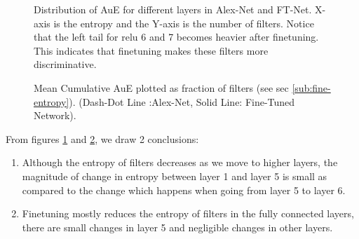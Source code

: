 \documentclass[runningheads]{llncs}
\begin{document}
\begin{figure}[t!]
\centering
{}
\caption{Distribution of AuE for different layers in Alex-Net and FT-Net. X-axis is the entropy and the Y-axis is the number of filters. Notice that the left tail for relu 6 and 7 becomes heavier after finetuning. This indicates that finetuning makes these filters more discriminative.}
\label{fig:fine-hist}
\end{figure}

\begin{figure}[t!]
\centering
{}
\caption{Mean Cumulative AuE plotted as fraction of filters (see sec \ref{sub:fine-entropy}). (Dash-Dot Line :Alex-Net, Solid Line: Fine-Tuned Network).}
\label{fig:fine-entropy}
\end{figure}

From figures \ref{fig:fine-hist} and \ref{fig:fine-entropy}, we draw 2 conclusions:
\begin{enumerate}
\item Although the entropy of filters decreases as we move to higher layers, the magnitude of change in entropy between layer 1 and layer 5 is small as compared to the change which happens when going from layer 5 to layer 6.
\item Finetuning mostly reduces the entropy of filters in the fully connected layers, there are small changes in layer 5 and negligible changes in other layers.
\end{enumerate} 
\end{document}
